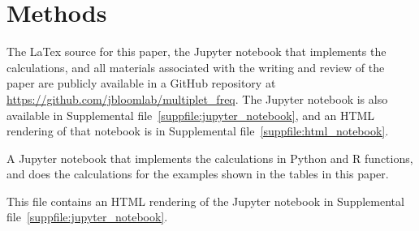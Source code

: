 \documentclass[fleqn,10pt,lineno]{wlpeerj} %
\begin{document}
\section*{Methods}
The LaTex source for this paper, the Jupyter notebook that implements the calculations, and all materials associated with the writing and review of the paper are publicly available in a GitHub repository at \url{https://github.com/jbloomlab/multiplet_freq}.
The Jupyter notebook is also available in Supplemental file~\ref{suppfile:jupyter_notebook}, and an HTML rendering of that notebook is in Supplemental file~\ref{suppfile:html_notebook}.




\clearpage

\begin{suppfile}
\caption{\label{suppfile:jupyter_notebook}
A Jupyter notebook that implements the calculations in Python and R functions, and does the calculations for the examples shown in the tables in this paper.
}
\end{suppfile}

\begin{suppfile}
\caption{\label{suppfile:html_notebook}
This file contains an HTML rendering of the Jupyter notebook in Supplemental file~\ref{suppfile:jupyter_notebook}.
}
\end{suppfile}
\end{document}
